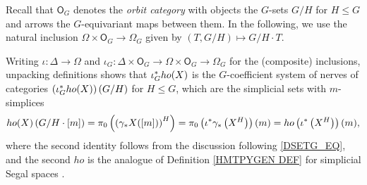 \documentclass[a4paper,10pt
 ,draft
]{article}%
\begin{document}
Recall that $\mathsf{O}_G$ denotes the \textit{orbit category} with objects the $G$-sets $G/H$ for $H \leq G$ and arrows the $G$-equivariant maps between them. In the following, we use the natural inclusion
$\Omega \times \mathsf{O}_G \to \Omega_G$
given by 
$(T,G/H) \mapsto G/H \cdot T$.

\begin{remark}
      Writing $\iota \colon \Delta \to \Omega$ and
      $\iota_G \colon \Delta \times \mathsf{O}_G \to \Omega \times \mathsf{O}_G \to \Omega_G$
      for the (composite) inclusions,
        unpacking definitions shows that $\iota_G^{\**}ho(X)$ is the $G$-coefficient system of nerves of categories $\left(\iota_G^{\**}ho(X)\right)(G/H)$ for $H \leq G$,
        which are the simplicial sets with $m$-simplices
	\begin{equation}\label{HOCOEFF EQ}
              ho(X)\left(G/H \cdot [m]\right) =
              \pi_0 \left( \left(\gamma_{\**}X([m])\right)^H\right) = 
              \pi_0 \left( \iota^{\**} \gamma_{\**}
              \left(X^H\right)\right)(m) = 
              ho\left(\iota^{\**}\left(X^H\right)\right)(m),
        \end{equation}
        where the second identity follows from
        the discussion following \eqref{DSETG_EQ},
        and the second $ho$ is the analogue of Definition \ref{HMTPYGEN DEF} for simplicial Segal spaces \cite[\S 5.5]{Rez01}.
\end{remark}
\end{document}
